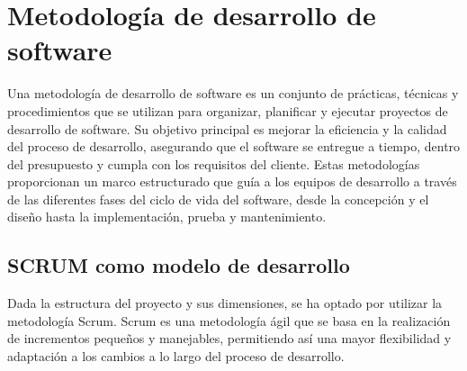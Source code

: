 \section{Metodología de desarrollo de software}
Una metodología de desarrollo de software es un conjunto de prácticas,
técnicas y procedimientos que se utilizan para organizar, planificar y ejecutar proyectos de desarrollo de software. Su objetivo principal es mejorar la eficiencia y la calidad del proceso de desarrollo, asegurando que el software se entregue a tiempo, dentro del presupuesto y cumpla con los requisitos del cliente. Estas metodologías proporcionan un marco estructurado que guía a los equipos de desarrollo a través de las diferentes fases del ciclo de vida del software, desde la concepción y el diseño hasta la implementación, prueba y mantenimiento.

\subsection{SCRUM como modelo de desarrollo}
Dada la estructura del proyecto y sus dimensiones, se ha optado por utilizar la metodología Scrum. Scrum es una metodología ágil que se basa en la realización de incrementos pequeños y manejables, permitiendo así una mayor flexibilidad y adaptación a los cambios a lo largo del proceso de desarrollo.

